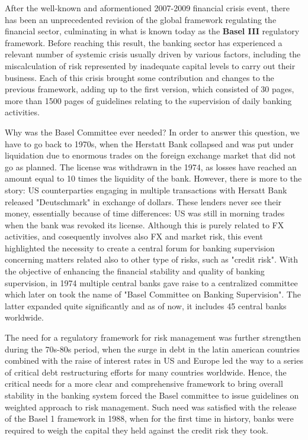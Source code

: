 \documentclass[a4paper,12pt]{article}
\begin{document}
    After the well-known and aformentioned 2007-2009 financial crisis event, there has been an unprecedented
    revision of the global framework regulating the financial sector, culminating in what is known today as the \textbf{Basel III} regulatory framework.
    Before reaching this result, the banking sector has experienced a relevant number of systemic crisis usually driven by various factors,
    including the miscalculation of risk represented by inadequate capital levels to carry out their business. Each of this crisis brought some contribution 
    and changes to the previous framework, adding up to the first version, which consisted of 30 pages, more than 1500 pages of guidelines relating to the 
    supervision of daily banking activities. 
    \newline

    Why was the Basel Committee ever needed? In order to answer this question, we have to go back to 1970s, when the Herstatt Bank collapsed and was put under liquidation 
    due to enormous trades on the foreign exchange market that did not go as planned. The license was withdrawn in the 1974, as losses have reached an amount equal to 10 times
    the liquidity of the bank. However, there is more to the story: US counterparties engaging in multiple transactions with Hersatt Bank released "Deutschmark" in exchange of dollars.
    These lenders never see their money, essentially because of time differences: US was still in morning trades when the bank was revoked its license. Although this is purely related to FX activities, 
    and cosequently involves also FX and market risk, this event highlighted the necessity to create a central forum for banking supervision concerning matters related also to other type of risks, 
    such as "credit risk". With the objective of enhancing the financial stability and quality of banking supervision, in 1974 multiple central banks gave raise to a centralized committee which later on 
    took the name of "Basel Committee on Banking Supervision". The latter expanded quite significantly and as of now, it includes 45 central banks worldwide.
    \newline

    The need for a regulatory framework for risk management was further strengthen during the 70s-80s period, when the surge in debt in the latin american countries combined with the raise of interest rates
    in US and Europe led the way to a series of critical debt restructuring efforts for many countries worldwide. Hence, the critical needs for a more clear and comprehensive framework to bring overall 
    stability in the banking system forced the Basel committee to issue guidelines on weighted approach to risk management. Such need was satisfied with the release of the Basel 1 framework in 1988, 
    when for the first time in history, banks were required to weigh the capital they held against the credit risk they took. 
    
\end{document}
